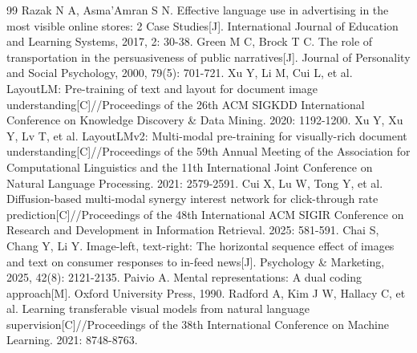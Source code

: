\begin{thebibliography}{99}
 Razak N A, Asma'Amran S N. Effective language use in advertising in the most visible online stores: 2 Case Studies[J]. International Journal of Education and Learning Systems, 2017, 2: 30-38.
 Green M C, Brock T C. The role of transportation in the persuasiveness of public narratives[J]. Journal of Personality and Social Psychology, 2000, 79(5): 701-721.
 Xu Y, Li M, Cui L, et al. LayoutLM: Pre-training of text and layout for document image understanding[C]//Proceedings of the 26th ACM SIGKDD International Conference on Knowledge Discovery \& Data Mining. 2020: 1192-1200.
 Xu Y, Xu Y, Lv T, et al. LayoutLMv2: Multi-modal pre-training for visually-rich document understanding[C]//Proceedings of the 59th Annual Meeting of the Association for Computational Linguistics and the 11th International Joint Conference on Natural Language Processing. 2021: 2579-2591.
 Cui X, Lu W, Tong Y, et al. Diffusion-based multi-modal synergy interest network for click-through rate prediction[C]//Proceedings of the 48th International ACM SIGIR Conference on Research and Development in Information Retrieval. 2025: 581-591.
 Chai S, Chang Y, Li Y. Image-left, text-right: The horizontal sequence effect of images and text on consumer responses to in-feed news[J]. Psychology \& Marketing, 2025, 42(8): 2121-2135.
 Paivio A. Mental representations: A dual coding approach[M]. Oxford University Press, 1990.
 Radford A, Kim J W, Hallacy C, et al. Learning transferable visual models from natural language supervision[C]//Proceedings of the 38th International Conference on Machine Learning. 2021: 8748-8763.
\end{thebibliography}
